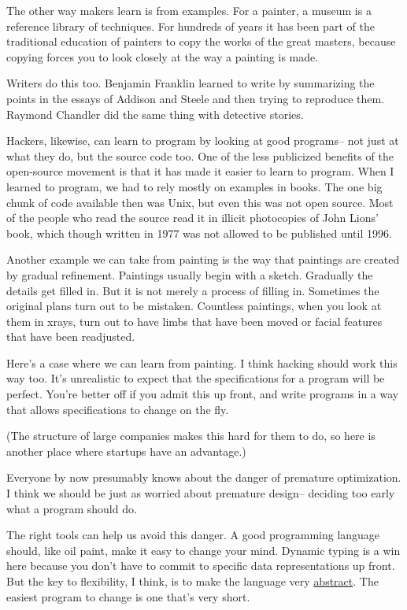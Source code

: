 The other way makers learn is from examples. For a painter, a museum is
a reference library of techniques. For hundreds of years it has been
part of the traditional education of painters to copy the works of the
great masters, because copying forces you to look closely at the way a
painting is made.

Writers do this too. Benjamin Franklin learned to write by summarizing
the points in the essays of Addison and Steele and then trying to
reproduce them. Raymond Chandler did the same thing with detective
stories.

Hackers, likewise, can learn to program by looking at good programs--
not just at what they do, but the source code too. One of the less
publicized benefits of the open-source movement is that it has made it
easier to learn to program. When I learned to program, we had to rely
mostly on examples in books. The one big chunk of code available then
was Unix, but even this was not open source. Most of the people who read
the source read it in illicit photocopies of John Lions' book, which
though written in 1977 was not allowed to be published until 1996.

Another example we can take from painting is the way that paintings are
created by gradual refinement. Paintings usually begin with a sketch.
Gradually the details get filled in. But it is not merely a process of
filling in. Sometimes the original plans turn out to be mistaken.
Countless paintings, when you look at them in xrays, turn out to have
limbs that have been moved or facial features that have been readjusted.

Here's a case where we can learn from painting. I think hacking should
work this way too. It's unrealistic to expect that the specifications
for a program will be perfect. You're better off if you admit this up
front, and write programs in a way that allows specifications to change
on the fly.

(The structure of large companies makes this hard for them to do, so
here is another place where startups have an advantage.)

Everyone by now presumably knows about the danger of premature
optimization. I think we should be just as worried about premature
design-- deciding too early what a program should do.

The right tools can help us avoid this danger. A good programming
language should, like oil paint, make it easy to change your mind.
Dynamic typing is a win here because you don't have to commit to
specific data representations up front. But the key to flexibility, I
think, is to make the language very \href{power.html}{abstract}. The
easiest program to change is one that's very short.

